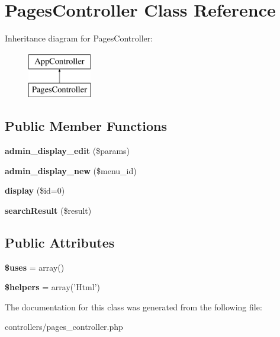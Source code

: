 \hypertarget{class_pages_controller}{
\section{\-Pages\-Controller \-Class \-Reference}
\label{class_pages_controller}
}
\-Inheritance diagram for \-Pages\-Controller\-:\begin{figure}[H]
\begin{center}
\leavevmode
\includegraphics[height=2.000000cm]{class_pages_controller}
\end{center}
\end{figure}
\subsection*{\-Public \-Member \-Functions}
\begin{DoxyCompactItemize}
\item 
\hypertarget{class_pages_controller_a30ba04e1b50761dcb1e565cb277b27df}{
{\bfseries admin\-\_\-display\-\_\-edit} (\$params)}
\label{class_pages_controller_a30ba04e1b50761dcb1e565cb277b27df}

\item 
\hypertarget{class_pages_controller_ae6a85e38760299accbd7b29acd9d8bd6}{
{\bfseries admin\-\_\-display\-\_\-new} (\$menu\-\_\-id)}
\label{class_pages_controller_ae6a85e38760299accbd7b29acd9d8bd6}

\item 
\hypertarget{class_pages_controller_aa8499032402c34632a3bdefcb33f47d0}{
{\bfseries display} (\$id=0)}
\label{class_pages_controller_aa8499032402c34632a3bdefcb33f47d0}

\item 
\hypertarget{class_pages_controller_ab05f69f2b5569c833338f6349e76e9fd}{
{\bfseries search\-Result} (\$result)}
\label{class_pages_controller_ab05f69f2b5569c833338f6349e76e9fd}

\end{DoxyCompactItemize}
\subsection*{\-Public \-Attributes}
\begin{DoxyCompactItemize}
\item 
\hypertarget{class_pages_controller_a75299c2f1604e1dba43af8f4234e4245}{
{\bfseries \$uses} = array()}
\label{class_pages_controller_a75299c2f1604e1dba43af8f4234e4245}

\item 
\hypertarget{class_pages_controller_a9dc3eac2482fd7925ed341208582c19a}{
{\bfseries \$helpers} = array('\-Html')}
\label{class_pages_controller_a9dc3eac2482fd7925ed341208582c19a}

\end{DoxyCompactItemize}


\-The documentation for this class was generated from the following file\-:\begin{DoxyCompactItemize}
\item 
controllers/pages\-\_\-controller.\-php\end{DoxyCompactItemize}
